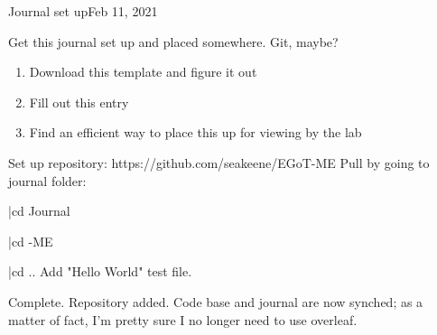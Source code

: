 \begin{entry}{Journal set up}{Feb 11, 2021}
    \objective 
    
    Get this journal set up and placed somewhere. Git, maybe?
    
    \outline
    
    \begin{enumerate}
        \item Download this template and figure it out
        \item Fill out this entry
        \item Find an efficient way to place this up for viewing by the lab
    \end{enumerate}
    
    \procedures
    
    Set up repository: https://github.com/seakeene/EGoT-ME
    Pull by going to journal folder:
        \item {}|cd Journal
        \item {}|cd \Users\stant\PycharmProjects\EGoT-ME
        \item {}|cd ..
    Add "Hello World" test file.
    
        

    
    \results
    
    Complete. Repository added. Code base and journal are now synched; as a matter of fact, I'm pretty sure I no longer need to use overleaf.
    
\end{entry}